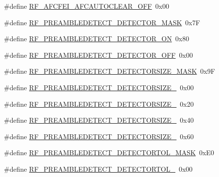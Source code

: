 \begin{DoxyCompactItemize}
\item 
\#define \mbox{\hyperlink{sx1276_regs-_fsk_8h_a49619aa659b86ba6827a8f07aa93ea1e}{R\+F\+\_\+\+A\+F\+C\+F\+E\+I\+\_\+\+A\+F\+C\+A\+U\+T\+O\+C\+L\+E\+A\+R\+\_\+\+O\+FF}}~0x00
\item 
\#define \mbox{\hyperlink{sx1276_regs-_fsk_8h_ad2e43fa3154b37dc7e0425619e018bfa}{R\+F\+\_\+\+P\+R\+E\+A\+M\+B\+L\+E\+D\+E\+T\+E\+C\+T\+\_\+\+D\+E\+T\+E\+C\+T\+O\+R\+\_\+\+M\+A\+SK}}~0x7F
\item 
\#define \mbox{\hyperlink{sx1276_regs-_fsk_8h_ae44badc1d61d3d787bac79bd8ec3855c}{R\+F\+\_\+\+P\+R\+E\+A\+M\+B\+L\+E\+D\+E\+T\+E\+C\+T\+\_\+\+D\+E\+T\+E\+C\+T\+O\+R\+\_\+\+ON}}~0x80
\item 
\#define \mbox{\hyperlink{sx1276_regs-_fsk_8h_a2236d29211449425ac6d2ea24441caa6}{R\+F\+\_\+\+P\+R\+E\+A\+M\+B\+L\+E\+D\+E\+T\+E\+C\+T\+\_\+\+D\+E\+T\+E\+C\+T\+O\+R\+\_\+\+O\+FF}}~0x00
\item 
\#define \mbox{\hyperlink{sx1276_regs-_fsk_8h_ac6926dd5bf77faf266c0755554312b3e}{R\+F\+\_\+\+P\+R\+E\+A\+M\+B\+L\+E\+D\+E\+T\+E\+C\+T\+\_\+\+D\+E\+T\+E\+C\+T\+O\+R\+S\+I\+Z\+E\+\_\+\+M\+A\+SK}}~0x9F
\item 
\#define \mbox{\hyperlink{sx1276_regs-_fsk_8h_a1ffab2e1b21abc6180629831a8cf95bc}{R\+F\+\_\+\+P\+R\+E\+A\+M\+B\+L\+E\+D\+E\+T\+E\+C\+T\+\_\+\+D\+E\+T\+E\+C\+T\+O\+R\+S\+I\+Z\+E\+\_}}~0x00
\item 
\#define \mbox{\hyperlink{sx1276_regs-_fsk_8h_a5301fc89f558a18b6b8770986c726753}{R\+F\+\_\+\+P\+R\+E\+A\+M\+B\+L\+E\+D\+E\+T\+E\+C\+T\+\_\+\+D\+E\+T\+E\+C\+T\+O\+R\+S\+I\+Z\+E\+\_}}~0x20
\item 
\#define \mbox{\hyperlink{sx1276_regs-_fsk_8h_a24df8f8f9be8c45c5d5b5ecc8481c4b6}{R\+F\+\_\+\+P\+R\+E\+A\+M\+B\+L\+E\+D\+E\+T\+E\+C\+T\+\_\+\+D\+E\+T\+E\+C\+T\+O\+R\+S\+I\+Z\+E\+\_}}~0x40
\item 
\#define \mbox{\hyperlink{sx1276_regs-_fsk_8h_a068ff264e935f49fcf3dbc2cea7e0e8a}{R\+F\+\_\+\+P\+R\+E\+A\+M\+B\+L\+E\+D\+E\+T\+E\+C\+T\+\_\+\+D\+E\+T\+E\+C\+T\+O\+R\+S\+I\+Z\+E\+\_}}~0x60
\item 
\#define \mbox{\hyperlink{sx1276_regs-_fsk_8h_afe6902084d6b9beef5eafd33ef3e8909}{R\+F\+\_\+\+P\+R\+E\+A\+M\+B\+L\+E\+D\+E\+T\+E\+C\+T\+\_\+\+D\+E\+T\+E\+C\+T\+O\+R\+T\+O\+L\+\_\+\+M\+A\+SK}}~0x\+E0
\item 
\#define \mbox{\hyperlink{sx1276_regs-_fsk_8h_a47aab5851ef02c5294a3f963992435e4}{R\+F\+\_\+\+P\+R\+E\+A\+M\+B\+L\+E\+D\+E\+T\+E\+C\+T\+\_\+\+D\+E\+T\+E\+C\+T\+O\+R\+T\+O\+L\+\_}}~0x00
\item 

\end{DoxyCompactItemize}
